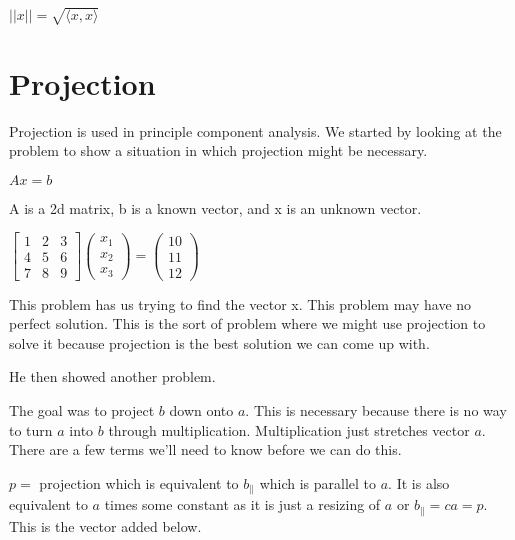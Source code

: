 \vspace{0.8em} 

$||x|| = \sqrt{\langle x,x \rangle}$


\section{Projection}

Projection is used in principle component analysis. We started by looking at the problem to show a situation in which projection might be necessary.

$Ax=b$

A is a 2d matrix, b is a known vector, and x is an unknown vector.

$\begin{bmatrix}
1 & 2 & 3\\
4 & 5 & 6\\
7 & 8 & 9
\end{bmatrix}
\begin{pmatrix}
x_1\\
x_2\\
x_3
\end{pmatrix}
=
\begin{pmatrix}
10\\
11\\
12
\end{pmatrix}$

This problem has us trying to find the vector x. This problem may have no perfect solution. This is the sort of problem where we might use projection to solve it because projection is the best solution we can come up with.

He then showed another problem.


The goal was to project $b$ down onto $a$. This is necessary because there is no way to turn $a$ into $b$ through multiplication. Multiplication just stretches vector $a$. There are a few terms we'll need to know before we can do this.

$p =$ projection which is equivalent to $b_\|$ which is parallel to $a$. It is also equivalent to $a$ times some constant as it is just a resizing of $a$ or $b_\| = ca = p$. This is the vector added below.

